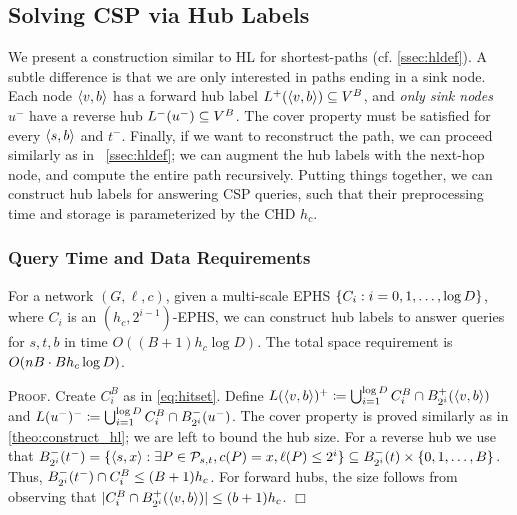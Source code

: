 \documentclass[opre,nonblindrev]{informs3} %
\renewenvironment{proof}[1][\textsc{Proof.}]{#1 }{\hfill $\Box$}
\begin{document}
\subsection{Solving CSP via Hub Labels}
\label{ssec:hlcsp}
We present a construction similar to HL for shortest-paths (cf. \cref{ssec:hldef}).
A subtle difference is that we are only interested in paths ending in a sink node.
Each node $\pp{v,b}$ has a forward hub label $\Lf(\pp{v,b})\subseteq V^B$, and \emph{only sink nodes} $u^-$ have a reverse hub $\Lb(u^-)\subseteq V^B$.
The cover property must be satisfied for every $\pp{s,b}$ and $t^-$.
Finally, if we want to reconstruct the path, we can proceed similarly as in ~\cref{ssec:hldef}; we can augment the hub labels with the next-hop node, and compute the entire path recursively.
Putting things together, we can construct hub labels for answering CSP queries, such that their preprocessing time and storage is parameterized by the CHD $h_c$.

\subsubsection{Query Time and Data Requirements}

\begin{theorem}
\label{theo:HLeff}
For a network $(G,\ell,c)$, given a multi-scale EPHS $\crl*{C_i:i=0,1,\ldots,\log D}$, where $C_i$ is an $(h_c,2^{i-1})$-EPHS, we can construct hub labels 
to answer queries for $s,t,b$ in time $O((B+1) h_c\log D)$.
The total space requirement is $\Or(nB \cdot Bh_c\log D)$.
\end{theorem}
\begin{proof}
Create $C_i^B$ as in \cref{eq:hitset}.
Define $L(\pp{v,b})^+ \defeq \bigcup_{i=1}^{\log D} C_i^B\cap \Bf_{2^i}(\pp{v,b})$ and $L(u^-)^-  \defeq \bigcup_{i=1}^{\log D} C_i^B\cap \Bb_{2^i}(u^-)$.
The cover property is proved similarly as in \cref{theo:construct_hl}; we are left to bound the hub size.
For a reverse hub we use that $\Bb_{2^i}(t^-) = \{\pp{s,x}: \exists P\in \Pst, c(P)=x, \ell(P)\leq 2^i\}
\subseteq \Bb_{2^i}(t)\times \{0,1,\ldots,B\}$.
Thus, $\Bb_{2^i}(t^-)\cap C_i^B\leq (B+1)h_c$.
For forward hubs, the size follows from observing that $ \card{C_i^B\cap \Bf_{2^i}(\pp{v,b})}\leq (b+1)h_c$.
\end{proof}
\end{document}
